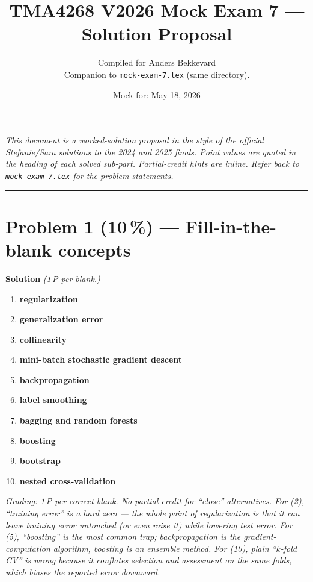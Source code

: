 \documentclass[11pt,a4paper]{article}
\title{TMA4268 V2026 Mock Exam 7 --- Solution Proposal\\[0.3em]
\large}
\author{Compiled for Anders Bekkevard\\[0.2em]
\small Companion to \texttt{mock-exam-7.tex} (same directory).}
\date{Mock for: May 18, 2026}
\newcommand{\points}[1]{\textbf{(#1\,\%)}}
\newcommand{\sol}{\noindent\textbf{Solution}}
\begin{document}
\maketitle

\noindent\textit{This document is a worked-solution proposal in the style of the official Stefanie/Sara solutions
to the 2024 and 2025 finals. Point values are quoted in the heading of each solved sub-part. Partial-credit
hints are inline. Refer back to \texttt{mock-exam-7.tex} for the problem statements.}

\vspace{0.6em}
\hrule
\vspace{1em}

\section*{Problem 1 \points{10} --- Fill-in-the-blank concepts}

\sol{} \emph{(1\,P per blank.)}

\begin{enumerate}[(1)]
  \item \textbf{regularization}
  \item \textbf{generalization error}
  \item \textbf{collinearity}
  \item \textbf{mini-batch stochastic gradient descent}
  \item \textbf{backpropagation}
  \item \textbf{label smoothing}
  \item \textbf{bagging and random forests}
  \item \textbf{boosting}
  \item \textbf{bootstrap}
  \item \textbf{nested cross-validation}
\end{enumerate}

\noindent\emph{Grading: 1\,P per correct blank. No partial credit for ``close'' alternatives. For (2),
``training error'' is a hard zero --- the whole point of regularization is that it can leave training
error untouched (or even raise it) while lowering test error. For (5), ``boosting'' is the most
common trap; backpropagation is the gradient-computation algorithm, boosting is an ensemble method.
For (10), plain ``$k$-fold CV'' is wrong because it conflates selection and assessment on the same
folds, which biases the reported error downward.}
\end{document}
